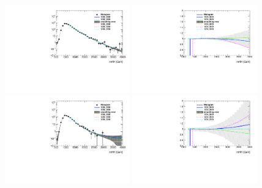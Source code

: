 
\begin{figure}[htbp!]
\begin{center}
\includegraphics[angle=270, width=0.48\textwidth]{figures/boosted/Syst_Smooth/smoothFuncRangeCompare_22_comp.pdf}
\includegraphics[angle=270, width=0.48\textwidth]{figures/boosted/Syst_Smooth/smoothFuncRangeCompare_22_comp_ratio.pdf} \\
\includegraphics[angle=270, width=0.48\textwidth]{figures/boosted/Syst_Smooth/smoothFuncRangeCompare_33_comp.pdf}
\includegraphics[angle=270, width=0.48\textwidth]{figures/boosted/Syst_Smooth/smoothFuncRangeCompare_33_comp_ratio.pdf} \\

\end{center}
\end{figure}
